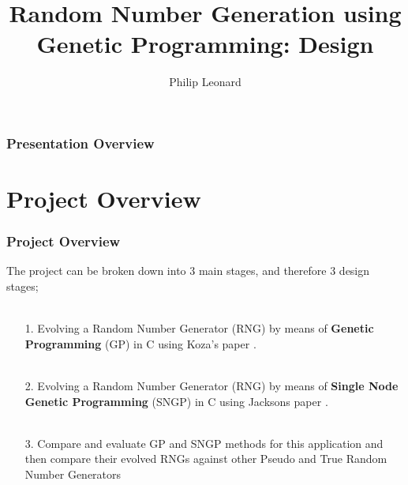 \documentclass{beamer}
\title[Short title]{Random Number Generation using Genetic Programming: Design} %
\author{Philip Leonard} %
\institute[UoL] %
{
University of Liverpool \\ %
\medskip
Primary Supervisor: Dr. David Jackson\\ Secondary Supervisor: Professor Paul E. Dunne\\
\medskip
\textit{sgpleona@student.liverpool.ac.uk} %
}
\date{} %
\begin{document}
\begin{frame}
\titlepage %
\end{frame}

\begin{frame}
\frametitle{Presentation Overview} %
\tableofcontents %
\end{frame}


\section{Project Overview} %

\begin{frame}
\frametitle{Project Overview}
The project can be broken down into 3 main stages, and therefore 3 design stages;\\~\\
\begin{itemize}
  \item[1.] Evolving a Random Number Generator (RNG) by means of \textbf{Genetic Programming} (GP) in C using Koza's paper \cite{kozarng}.\\~\\
  \item[2.] Evolving a Random Number Generator (RNG) by means of \textbf{Single Node Genetic Programming} (SNGP) in C using Jacksons paper \cite{jacksonsngp2}.\\~\\
  \item[3.] Compare and evaluate GP and SNGP methods for this application and then compare their evolved RNGs against other Pseudo and True Random Number Generators
\end{itemize}
\end{frame}
\end{document}
